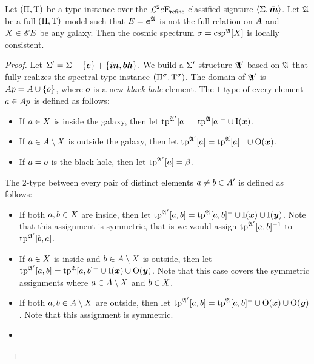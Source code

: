 \begin{remark}\label{rem:csp-is-locally-consistent}
Let $(\Pi,\mathrm{T})$ be a type instance over the
$\mathcal{L}^{2}{e}\mathrm{E}_{\mathsf{refine}}$-classified signture $\left\langle \mathrm{\Sigma},\bar{\bm{m}} \right\rangle$.
Let $\mathfrak{A}$ be a full $(\Pi,\mathrm{T})$-model such that $E = \bm{e}^{\mathfrak{A}}$ is
not the full relation on $A$ and $X \in {\mathscr{E}E}$ be any galaxy.
Then the cosmic spectrum $\sigma = \operatorname{csp}^{\mathfrak{A}}[X]$ is locally consistent.
\end{remark}
\begin{proof}
Let $\mathrm{\Sigma'} = \mathrm{\Sigma} - \left\{\bm{e}\right\} + \left\{\bm{in},\bm{bh}\right\}$.
We build a $\mathrm{\Sigma'}$-structure $\mathfrak{A'}$ based on $\mathfrak{A}$ that fully realizes the
spectral type instance $(\Pi^{\sigma},\mathrm{T}^{\sigma})$.
The domain of $\mathfrak{A'}$ is 
$Ap = A \cup \left\{o\right\}$, where $o$ is a new
\emph{black hole} element. The $1$-type of every element $a \in Ap$
is defined as follows:
\begin{itemize}
  \item[\refsticondI]
  If $a \in X$ is inside the galaxy, then let
  $\operatorname{tp}^{\mathfrak{A'}}[a] = \operatorname{tp}^{\mathfrak{A}}[a]^{-} \cup \mathrm{I}(\bm{x})$.
  \item[\refsticondO]
  If $a \in A \setminus X$ is outside the galaxy, then let
  $\operatorname{tp}^{\mathfrak{A'}}[a] = \operatorname{tp}^{\mathfrak{A}}[a]^{-} \cup \mathrm{O}(\bm{x})$.
  \item[\refsticondB] If $a = o$ is the black hole, then let
  $\operatorname{tp}^{\mathfrak{A'}}[a] = \beta$.
\end{itemize}
The $2$-type between every pair of distinct elements $a \neq b \in A'$
is defined as follows:
\begin{itemize}
  \item[\refsticondII]
  If both $a,b \in X$ are inside, then let
  $\operatorname{tp}^{\mathfrak{A'}}[a,b] = \operatorname{tp}^{\mathfrak{A}}[a,b]^{-} \cup \mathrm{I}(\bm{x}) \cup \mathrm{I}(\bm{y})$.
  Note that this assignment is symmetric, that is we would assign
  $\operatorname{tp}^{\mathfrak{A'}}[a,b]^{-1}$ to $\operatorname{tp}^{\mathfrak{A'}}[b,a]$.
  \item[\refsticondIO]
  If $a \in X$ is inside and $b \in A \setminus
  X$ is outside, then let
  $\operatorname{tp}^{\mathfrak{A'}}[a,b] = \operatorname{tp}^{\mathfrak{A}}[a,b]^{-} \cup \mathrm{I}(\bm{x}) \cup \mathrm{O}(\bm{y})$.
  Note that this case covers the symmetric assignments where $a \in
  A\setminus X$ and $b \in X$.
  \item[\refsticondOO]
  If both $a, b \in A\setminus X$ are outside, then let
  $\operatorname{tp}^{\mathfrak{A'}}[a,b] = \operatorname{tp}^{\mathfrak{A}}[a,b]^{-} \cup \mathrm{O}(\bm{x}) \cup
  \mathrm{O}(\bm{y})$. Note that this assignment is symmetric.
  \item[\refsticondIB]

\end{itemize}
\end{proof}
